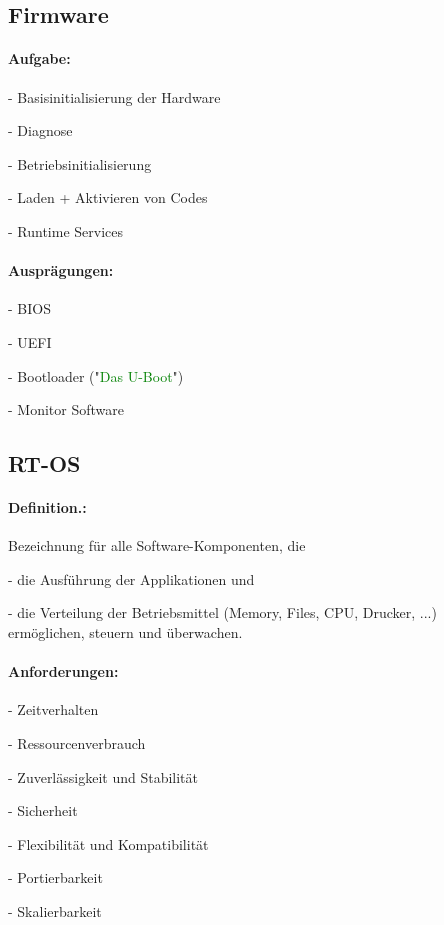 \documentclass[12pt,a4paper,oneside,ngerman]{article}
\begin{document}
\subsection{Firmware}
\paragraph{Aufgabe:}
\begin{description}
	\item - Basisinitialisierung der Hardware
	\item - Diagnose
	\item - Betriebsinitialisierung
	\item - Laden + Aktivieren von Codes
	\item - Runtime Services
\end{description}
\paragraph{Ausprägungen:}
\begin{description}
	\item - BIOS
	\item - UEFI
	\item - Bootloader ("\textcolor{green}{Das U-Boot}")
	\item - Monitor Software
\end{description}

\subsection{RT-OS}
\paragraph{Definition.:}
Bezeichnung für alle Software-Komponenten, die
\begin{description}
	\item - die Ausführung der Applikationen und
	\item - die Verteilung der Betriebsmittel (Memory, Files, CPU, Drucker, ...) ermöglichen, steuern und überwachen.
\end{description}
\paragraph{Anforderungen:}
\begin{description}
	\item - Zeitverhalten
	\item - Ressourcenverbrauch
	\item - Zuverlässigkeit und Stabilität
	\item - Sicherheit
	\item - Flexibilität und Kompatibilität
	\item - Portierbarkeit
	\item - Skalierbarkeit
\end{description}
\end{document}

